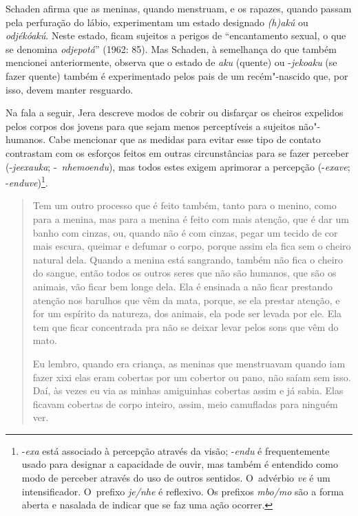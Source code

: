 Schaden afirma que as meninas, quando menstruam, e os rapazes, quando
passam pela perfuração do lábio, experimentam um estado designado
\emph{(h)akú} ou \emph{odjékóakú}. Neste estado, ficam sujeitos a perigos de
``encantamento sexual, o que se denomina \emph{odjepotá}'' (1962: 85). Mas
Schaden, à semelhança do que também mencionei anteriormente, observa
que o estado de \emph{aku} (quente) ou -\emph{jekoaku} (se fazer quente) também é
experimentado pelos pais de um recém"-nascido que, por isso, devem
manter resguardo. 

Na fala a seguir, Jera descreve modos de cobrir ou disfarçar os cheiros
expelidos pelos corpos dos jovens para que sejam menos perceptíveis a
sujeitos não"-humanos. Cabe mencionar que as medidas para evitar esse
tipo de contato contrastam com os esforços feitos em outras
circunstâncias para se fazer perceber (-\emph{jeexauka}; -~\emph{nhemoendu}), mas
todos estes exigem aprimorar a percepção (-\emph{exave};
-\emph{enduve})\footnote[12]{-\emph{exa} está associado à percepção através da visão;
-\emph{endu} é frequentemente usado para designar a capacidade de ouvir, mas
também é entendido como modo de perceber através do uso de outros
sentidos. O~advérbio \emph{ve} é um intensificador. O~prefixo \emph{je/nhe} é
reflexivo. Os prefixos \emph{mbo/mo} são a forma aberta e nasalada de indicar
que se faz uma ação ocorrer. }. 

\begin{quote}
\noindent
Tem um outro processo que é feito também, tanto para o menino, como para
a menina, mas para a menina é feito com mais atenção, que é dar um
banho com cinzas, ou, quando não é com cinzas, pegar um tecido de cor
mais escura, queimar e defumar o corpo, porque assim ela fica sem o
cheiro natural dela. Quando a menina está sangrando, também não fica o
cheiro do sangue, então todos os outros seres que não são humanos, que
são os animais, vão ficar bem longe dela. Ela é ensinada a não ficar
prestando atenção nos barulhos que vêm da mata, porque, se ela prestar
atenção, e for um espírito da natureza, dos animais, ela pode ser
levada por ele. Ela tem que ficar concentrada pra não se deixar levar
pelos sons que vêm do mato.

\noindent
Eu lembro, quando era criança, as meninas que menstruavam quando iam
fazer xixi elas eram cobertas por um cobertor ou pano, não saíam sem
isso. Daí, às vezes eu via as minhas amiguinhas cobertas assim e já
sabia. Elas ficavam cobertas de corpo inteiro, assim, meio camufladas
para ninguém ver.
\end{quote}

